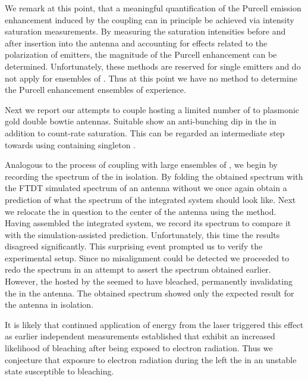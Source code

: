    We remark at this point, that a meaningful quantification of the Purcell emission enhancement induced by the coupling can in principle be achieved via intensity saturation measurements. By measuring the saturation intensities before and after insertion into the antenna and accounting for effects related to the polarization of emitters, the magnitude of the Purcell enhancement can be determined. Unfortunately, these methods are reserved for single emitters and do not apply for ensembles of \sivs. Thus at this point we have no method to determine the Purcell enhancement ensembles of \sivs experience.


   Next we report our attempts to couple \nds hosting a limited number of \sivs to plasmonic gold double bowtie antennas. Suitable \nds show an anti-bunching dip in the \gtf in addition to count-rate saturation. This can be regarded an intermediate step towards using \nds containing singleton \sivs.

   Analogous to the process of coupling \nds with large ensembles of \sivs, we begin by recording the spectrum of the \nd in isolation. By folding the obtained spectrum with the FTDT simulated spectrum of an antenna without \nd we once again obtain a prediction of what the spectrum of the integrated system should look like. Next we relocate the \nd in question to the center of the antenna using the \pp method. Having assembled the integrated system, we record its spectrum to compare it with the simulation-assisted prediction. Unfortunately, this time the results disagreed significantly. This surprising event prompted us to verify the experimental setup. Since no misalignment could be detected we proceeded to redo the spectrum in an attempt to assert the spectrum obtained earlier. However, the \sivs hosted by the \nd seemed to have bleached, permanently invalidating the \nd in the antenna. The obtained spectrum showed only the expected result for the antenna in isolation.

   It is likely that continued application of energy from the laser triggered this effect as earlier independent measurements established that \sivs exhibit an increased likelihood of bleaching after being exposed to electron radiation. Thus we conjecture that exposure to electron radiation during the \pp left the \sivs in an unstable state susceptible to bleaching.

